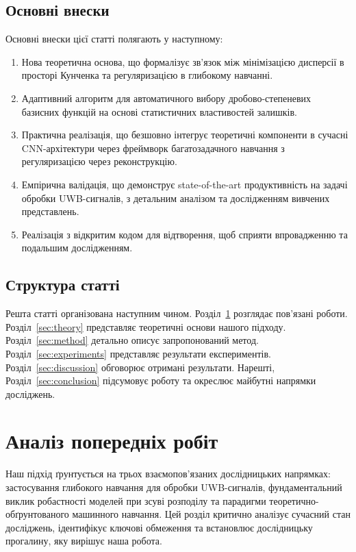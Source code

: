 \documentclass[12pt,a4paper]{article}
\begin{document}
	\subsection{Основні внески}
	
	Основні внески цієї статті полягають у наступному:
	
	\begin{enumerate}
		\item Нова теоретична основа, що формалізує зв'язок між мінімізацією дисперсії в просторі Кунченка та регуляризацією в глибокому навчанні.
		
		\item Адаптивний алгоритм для автоматичного вибору дробово-степеневих базисних функцій на основі статистичних властивостей залишків.
		
		\item Практична реалізація, що безшовно інтегрує теоретичні компоненти в сучасні CNN-архітектури через фреймворк багатозадачного навчання з регуляризацією через реконструкцію.
		
		\item Емпірична валідація, що демонструє state-of-the-art продуктивність на задачі обробки UWB-сигналів, з детальним аналізом та дослідженням вивчених представлень.
		
		\item Реалізація з відкритим кодом для відтворення, щоб сприяти впровадженню та подальшим дослідженням.
	\end{enumerate}
	
	\subsection{Структура статті}
	
	Решта статті організована наступним чином. Розділ~\ref{sec:related} розглядає пов'язані роботи. Розділ~\ref{sec:theory} представляє теоретичні основи нашого підходу. Розділ~\ref{sec:method} детально описує запропонований метод. Розділ~\ref{sec:experiments} представляє результати експериментів. Розділ~\ref{sec:discussion} обговорює отримані результати. Нарешті, Розділ~\ref{sec:conclusion} підсумовує роботу та окреслює майбутні напрямки досліджень.
	
\section{Аналіз попередніх робіт}
\label{sec:related}

Наш підхід ґрунтується на трьох взаємопов'язаних дослідницьких напрямках: застосування глибокого навчання для обробки UWB-сигналів, фундаментальний виклик робастності моделей при зсуві розподілу та парадигми теоретично-обґрунтованого машинного навчання. Цей розділ критично аналізує сучасний стан досліджень, ідентифікує ключові обмеження та встановлює дослідницьку прогалину, яку вирішує наша робота.
\end{document}
